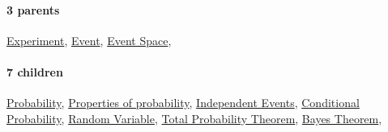 \documentclass[../main.tex]{subfiles}
\begin{document}
\paragraph{3 parents} \hyperref[statement:Experiment]{Experiment}, \hyperref[statement:Event]{Event}, \hyperref[statement:Event Space]{Event Space}, 
\paragraph{7 children} \hyperref[statement:Probability]{Probability}, \hyperref[statement:Properties of probability]{Properties of probability}, \hyperref[statement:Independent Events]{Independent Events}, \hyperref[statement:Conditional Probability]{Conditional Probability}, \hyperref[statement:Random Variable]{Random Variable}, \hyperref[statement:Total Probability Theorem]{Total Probability Theorem}, \hyperref[statement:Bayes Theorem]{Bayes Theorem}, 
\end{document}

